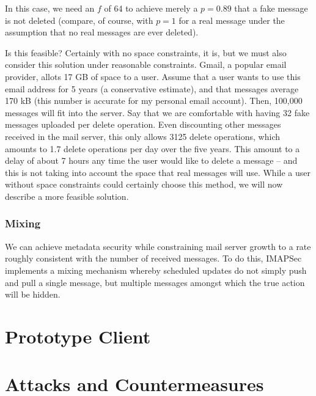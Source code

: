 \documentclass[pageno]{jpaper}
\newcommand{\project}{IMAPSec }
\begin{document}
In this case, we need an $f$ of 64 to achieve merely a $p=0.89$ that a fake message is not deleted (compare, of course, with $p=1$ for a real message under the assumption that no real messages are ever deleted).

Is this feasible? Certainly with no space constraints, it is, but we must also consider this solution under reasonable constraints. Gmail, a popular email provider, allots 17 GB of space to a user. Assume that a user wants to use this email address for 5 years (a conservative estimate), and that messages average 170 kB (this number is accurate for my personal email account). Then, 100,000 messages will fit into the server. Say that we are comfortable with having 32 fake messages uploaded per delete operation. Even discounting other messages received in the mail server, this only allows 3125 delete operations, which amounts to 1.7 delete operations per day over the five years. This amount to a delay of about 7 hours any time the user would like to delete a message \--- and this is not taking into account the space that real messages will use. While a user without space constraints could certainly choose this method, we will now describe a more feasible solution.

\subsubsection{Mixing}
We can achieve metadata security while constraining mail server growth to a rate roughly consistent with the number of received messages. To do this, \project implements a mixing mechanism whereby scheduled updates do not simply push and pull a single message, but multiple messages amongst which the true action will be hidden.


\section{Prototype Client}



\section{Attacks and Countermeasures}
\end{document}
